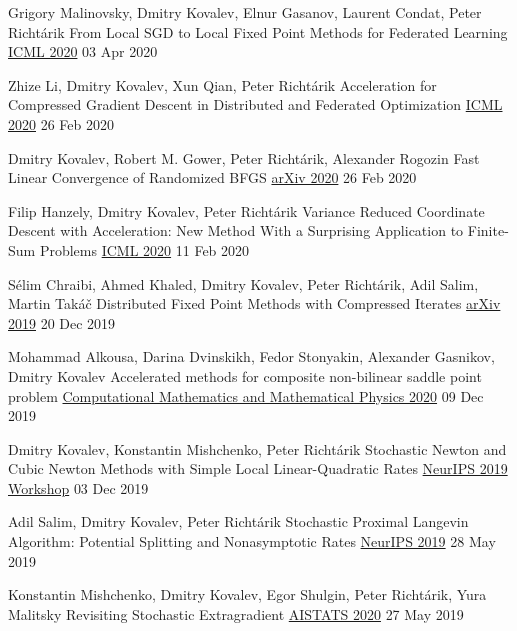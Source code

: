 \begin{cventries}
\cventry
{Grigory Malinovsky, Dmitry Kovalev, Elnur Gasanov, Laurent Condat, Peter Richtárik} %
{From Local SGD to Local Fixed Point Methods for Federated Learning} %
{\href{http://proceedings.mlr.press/v119/malinovskiy20a.html}{ICML 2020}} 
{03 Apr 2020} %
{}	

\cventry
{Zhize Li, Dmitry Kovalev, Xun Qian, Peter Richtárik} %
{Acceleration for Compressed Gradient Descent in Distributed and Federated Optimization} %
{\href{http://proceedings.mlr.press/v119/li20g.html}{ICML 2020}} 
{26 Feb 2020} %
{}	

\cventry
{Dmitry Kovalev, Robert M. Gower, Peter Richtárik, Alexander Rogozin} %
{Fast Linear Convergence of Randomized BFGS} %
{\href{https://arxiv.org/abs/2002.11337}{arXiv 2020}} 
{26 Feb 2020} %
{}	

\cventry
{Filip Hanzely, Dmitry Kovalev, Peter Richtárik} %
{Variance Reduced Coordinate Descent with Acceleration: New Method With a Surprising Application to Finite-Sum Problems} %
{\href{http://proceedings.mlr.press/v119/hanzely20b.html}{ICML 2020}} 
{11 Feb 2020} %
{}	

\cventry
{Sélim Chraibi, Ahmed Khaled, Dmitry Kovalev, Peter Richtárik, Adil Salim, Martin Takáč} %
{Distributed Fixed Point Methods with Compressed Iterates} %
{\href{https://arxiv.org/abs/1912.09925}{arXiv 2019}} 
{20 Dec 2019} %
{}	

\cventry
{Mohammad Alkousa, Darina Dvinskikh, Fedor Stonyakin, Alexander Gasnikov, Dmitry Kovalev} %
{Accelerated methods for composite non-bilinear saddle point problem} %
{\href{https://link.springer.com/article/10.1134/S0965542520110020}{Computational Mathematics and Mathematical Physics 2020}} 
{09 Dec 2019} %
{}	

\cventry
{Dmitry Kovalev, Konstantin Mishchenko, Peter Richtárik} %
{Stochastic Newton and Cubic Newton Methods with Simple Local Linear-Quadratic Rates} %
{\href{https://sites.google.com/site/optneurips19/}{NeurIPS 2019 Workshop}} 
{03 Dec 2019} %
{}	

\cventry
{Adil Salim, Dmitry Kovalev, Peter Richtárik} %
{Stochastic Proximal Langevin Algorithm: Potential Splitting and Nonasymptotic Rates} %
{\href{https://papers.nips.cc/paper/8891-stochastic-proximal-langevin-algorithm-potential-splitting-and-nonasymptotic-rates}{NeurIPS 2019}} 
{28 May 2019} %
{}	

\cventry
{Konstantin Mishchenko, Dmitry Kovalev, Egor Shulgin, Peter Richtárik, Yura Malitsky} %
{Revisiting Stochastic Extragradient} %
{\href{http://proceedings.mlr.press/v108/mishchenko20a}{AISTATS 2020}} 
{27 May 2019} %
{}	


\end{cventries}
